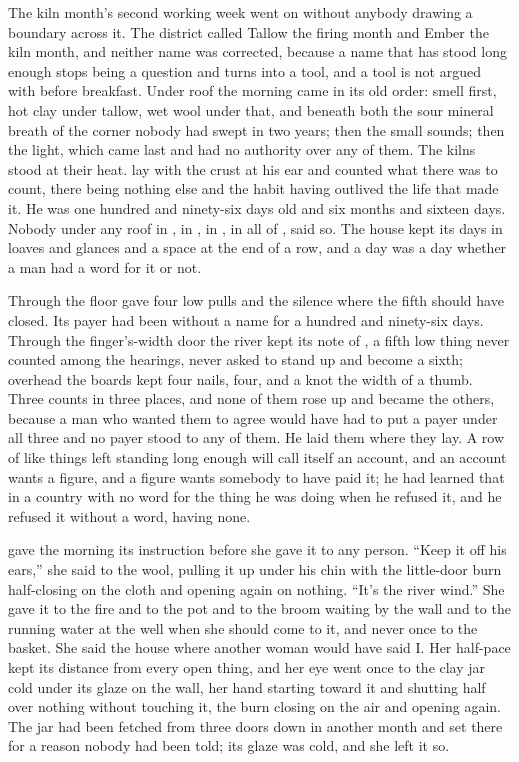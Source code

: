 
The kiln month's second working week went on without anybody drawing a boundary across it. The district called Tallow the firing month and Ember the kiln month, and neither name was corrected, because a name that has stood long enough stops being a question and turns into a tool, and a tool is not argued with before breakfast. Under  roof the morning came in its old order: smell first, hot clay under tallow, wet wool under that, and beneath both the sour mineral breath of the corner nobody had swept in two years; then the small sounds; then the light, which came last and had no authority over any of them. The kilns stood at their heat.  lay with the crust at his ear and counted what there was to count, there being nothing else and the habit having outlived the life that made it. He was one hundred and ninety-six days old and six months and sixteen days. Nobody under any roof in , in , in , in all of , said so. The house kept its days in loaves and glances and a space at the end of a row, and a day was a day whether a man had a word for it or not.

Through the floor  gave four low pulls and the silence where the fifth should have closed. Its payer had been without a name for a hundred and ninety-six days. Through the finger's-width door the river kept its note of , a fifth low thing never counted among the hearings, never asked to stand up and become a sixth; overhead the boards kept four nails, four, and a knot the width of a thumb. Three counts in three places, and none of them rose up and became the others, because a man who wanted them to agree would have had to put a payer under all three and no payer stood to any of them. He laid them where they lay. A row of like things left standing long enough will call itself an account, and an account wants a figure, and a figure wants somebody to have paid it; he had learned that in a country with no word for the thing he was doing when he refused it, and he refused it without a word, having none.

 gave the morning its instruction before she gave it to any person. “Keep it off his ears,” she said to the wool, pulling it up under his chin with the little-door burn half-closing on the cloth and opening again on nothing. “It's the river wind.” She gave it to the fire and to the pot and to the broom waiting by the wall and to the running water at the well when she should come to it, and never once to the basket. She said the house where another woman would have said I. Her half-pace kept its distance from every open thing, and her eye went once to the clay jar cold under its glaze on the wall, her hand starting toward it and shutting half over nothing without touching it, the burn closing on the air and opening again. The jar had been fetched from three doors down in another month and set there for a reason nobody had been told; its glaze was cold, and she left it so.

